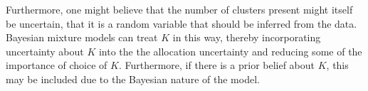 \documentclass{bioinfo}
\begin{document}
Furthermore, one might believe that the number of clusters present might itself be uncertain, that it is a random variable that should be inferred from the data. Bayesian mixture models can treat $K$ in this way, thereby incorporating uncertainty about $K$ into the the allocation uncertainty and reducing some of the importance of choice of $K$. Furthermore, if there is a prior belief about $K$, this may be included due to the Bayesian nature of the model. 







\end{document}
